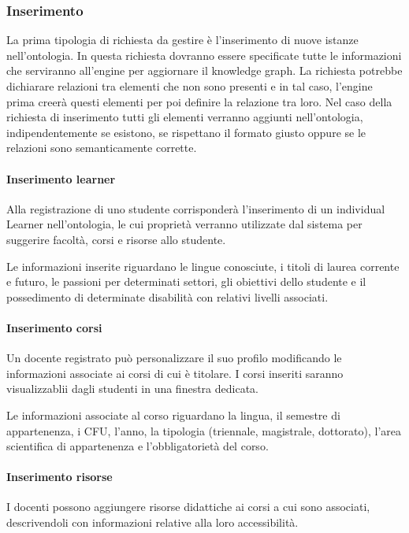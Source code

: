 \subsubsection{Inserimento}
La prima tipologia di richiesta da gestire è l’inserimento di nuove istanze nell'ontologia. In questa richiesta dovranno essere specificate tutte le informazioni che serviranno all’engine per aggiornare il knowledge graph. La richiesta potrebbe dichiarare relazioni tra elementi che non sono presenti e in tal caso, l’engine prima creerà questi elementi per poi definire la relazione tra
loro. Nel caso della richiesta di inserimento tutti gli elementi verranno aggiunti nell’ontologia, indipendentemente se esistono, se rispettano il formato giusto oppure se le relazioni sono semanticamente corrette.

\paragraph{Inserimento learner}
Alla registrazione di uno studente corrisponderà l'inserimento di un individual Learner nell'ontologia, le cui proprietà verranno utilizzate dal sistema per suggerire facoltà, corsi e risorse allo studente.

Le informazioni inserite riguardano le lingue conosciute, i titoli di laurea corrente e futuro, le passioni per determinati settori, gli obiettivi dello studente e il possedimento di determinate disabilità con relativi livelli associati.

\paragraph{Inserimento corsi}
Un docente registrato può personalizzare il suo profilo modificando le informazioni associate ai corsi di cui è titolare. I corsi inseriti saranno visualizzablii dagli studenti in una finestra dedicata.

Le informazioni associate al corso riguardano la lingua, il semestre di appartenenza, i CFU, l'anno, la tipologia (triennale, magistrale, dottorato), l'area scientifica di appartenenza e l'obbligatorietà del corso.

\paragraph{Inserimento risorse}
I docenti possono aggiungere risorse didattiche ai corsi a cui sono associati, descrivendoli con informazioni relative alla loro accessibilità.

